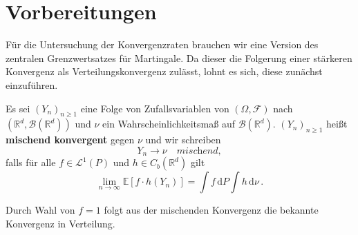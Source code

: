 \documentclass[ngerman,a4paper,11pt]{scrartcl}
\newcommand{\EE}{\mathbb{E}}
\newcommand{\RR}{\mathbb{R}}
\newcommand{\bb}{\mathcal{B}}
\newcommand{\ff}{\mathcal{F}}
\renewcommand{\ll}{\mathcal{L}}
\newcommand{\Cb}[1]{C_b(#1)}
\newcommand{\expect}[1]{\EE[#1]}
\newcommand{\dvar}[1]{\,\mathrm{d}#1}
\begin{document}
\section{Vorbereitungen}
Für die Untersuchung der Konvergenzraten brauchen wir eine Version des
zentralen Grenzwertsatzes für Martingale. Da dieser die Folgerung einer
stärkeren Konvergenz als Verteilungskonvergenz zulässt, lohnt es sich, diese
zunächst einzuführen.
\begin{defn}
  Es sei $(Y_n)_{n\geq 1}$ eine Folge von Zufallsvariablen von $(\Omega, \ff)$
  nach $(\RR^d, \bb(\RR^d))$ und $\nu$ ein Wahrscheinlichkeitsmaß auf
  $\bb(\RR^d)$. $(Y_n)_{n\geq 1}$ heißt \textbf{mischend konvergent} gegen $\nu$
  und wir schreiben
  \begin{equation*}
    Y_n\longrightarrow\nu \quad\textit{mischend}, 
  \end{equation*}
  falls für alle $f\in\ll^1(P)$ und $h\in\Cb{\RR^d}$ gilt
  \begin{equation*}
   \lim_{n\to\infty} \expect{f\cdot h(Y_n)} = \int f\dvar{P}\int h\dvar{\nu}\,.
  \end{equation*}
\end{defn}
\begin{rem}
 Durch Wahl von $f=1$ folgt aus der mischenden Konvergenz die bekannte
 Konvergenz in Verteilung. 
\end{rem}
\end{document}
